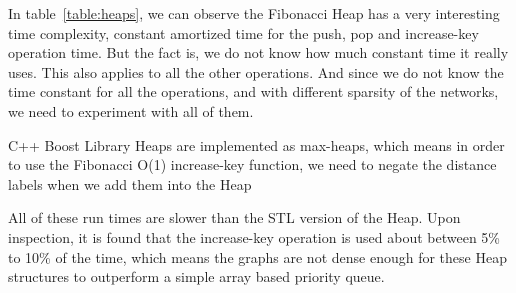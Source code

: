 In table~\ref{table:heaps},
we can observe the Fibonacci Heap has a very interesting time complexity,
constant amortized time for the push, pop and increase-key operation time.
But the fact is,
we do not know how much constant time it really uses.
This also applies to all the other operations.
And since we do not know the time constant for all the operations,
and with different sparsity of the networks,
we need to experiment with all of them.


C++ Boost Library Heaps are implemented as max-heaps,
which means in order to use the Fibonacci O(1) increase-key function,
we need to negate the distance labels when we add them into the Heap

All of these run times are slower than the STL version of the Heap.
Upon inspection,
it is found that the increase-key operation is used about between 5\% to 10\%
of the time,
which means the graphs are not dense enough for these Heap structures to outperform a
simple array based priority queue.
